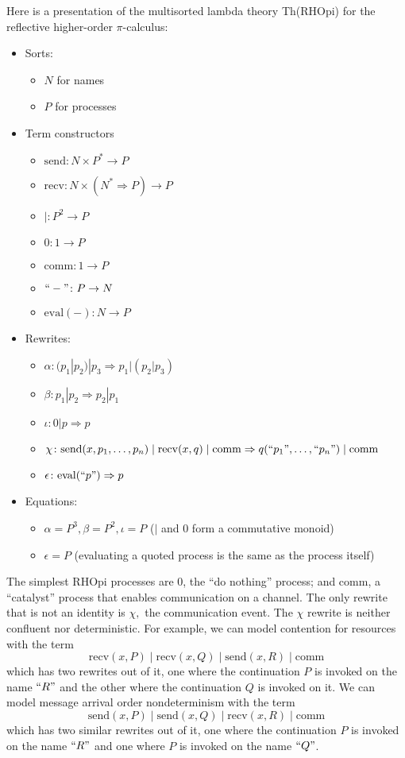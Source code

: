 \documentclass{llncs}
\newcommand{\maps}{\colon}
\newcommand{\send}{\mathrm{send}}
\newcommand{\recv}{\mathrm{recv}}
\newcommand{\comm}{\mathrm{comm}}
\renewcommand{\quote}[1]{``#1"}
\newcommand{\deref}[1]{\mathrm{eval}(#1)}
\begin{document}
Here is a presentation of the multisorted lambda theory Th(RHOpi) for the reflective higher-order $\pi$-calculus:
\begin{itemize}
  \item Sorts:
  \begin{itemize}
    \item $N$ for names
    \item $P$ for processes
  \end{itemize}
  \item Term constructors
  \begin{itemize}
    \item $\send\maps N \times P^* \to P$
    \item $\recv\maps N \times (N^* \Rightarrow P) \to P$
    \item $|\maps P^2 \to P$
    \item $0\maps 1 \to P$
    \item $\comm\maps 1 \to P$
    \item $\quote{-}\maps P \to N$
    \item $\deref{-}\maps N \to P$
  \end{itemize}
  \item Rewrites:
  \begin{itemize}
    \item $\alpha\maps (p_1 | p_2) | p_3 \Rightarrow p_1 | (p_2 | p_3)$
    \item $\beta\maps p_1 | p_2 \Rightarrow p_2 | p_1$
    \item $\iota\maps 0 | p \Rightarrow p$
    \item $\chi\maps \send(x, p_1, \ldots, p_n) \;|\; \recv(x, q) \;|\; \comm \Rightarrow q(\quote{p_1}, \ldots, \quote{p_n}) \;|\; \comm$
    \item $\epsilon\maps \deref{\quote{p}} \Rightarrow p$
  \end{itemize}
  \item Equations:
  \begin{itemize}
    \item $\alpha = P^3, \beta = P^2, \iota = P$ ($|$ and 0 form a commutative monoid)
    \item $\epsilon = P$ (evaluating a quoted process is the same as the process itself)
  \end{itemize}
\end{itemize}

The simplest RHOpi processes are 0, the ``do nothing'' process; and comm, a ``catalyst'' process that enables communication on a channel.  The only rewrite that is not an identity is $\chi,$ the communication event.  The $\chi$ rewrite is neither confluent nor deterministic.  For example, we can model contention for resources with the term
\[ \recv(x, P)\;|\;\recv(x, Q)\;|\;\send(x,R)\;|\;\comm \]
which has two rewrites out of it, one where the continuation $P$ is invoked on the name $\quote{R}$ and the other where the continuation $Q$ is invoked on it.  We can model message arrival order nondeterminism with the term
\[ \send(x, P)\;|\;\send(x, Q)\;|\;\recv(x,R)\;|\;\comm \]
which has two similar rewrites out of it, one where the continuation $P$ is invoked on the name $\quote{R}$ and one where $P$ is invoked on the name $\quote{Q}$.
\end{document}
